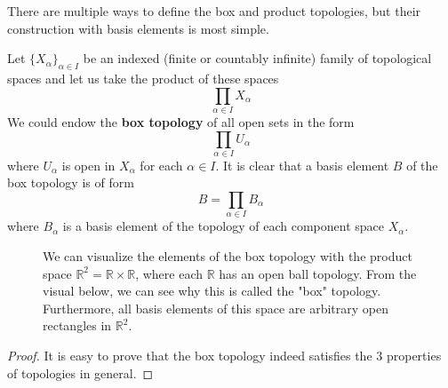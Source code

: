   There are multiple ways to define the box and product topologies, but their construction with basis elements is most simple. 

  \begin{theorem}
    Let $\{X_\alpha\}_{\alpha \in I}$ be an indexed (finite or countably infinite) family of topological spaces and let us take the product of these spaces
    \begin{equation}
      \prod_{\alpha \in I} X_\alpha
    \end{equation}
    We could endow the \textbf{box topology} of all open sets in the form
    \begin{equation}
      \prod_{\alpha \in I} U_\alpha
    \end{equation}
    where $U_\alpha$ is open in $X_\alpha$ for each $\alpha \in I$. It is clear that a basis element $B$ of the box topology is of form
    \begin{equation}
      B = \prod_{\alpha \in I} B_\alpha
    \end{equation}
    where $B_\alpha$ is a basis element of the topology of each component space $X_\alpha$. 
    \begin{figure}[H]
      \centering 
      \caption{We can visualize the elements of the box topology with the product space $\mathbb{R}^2 = \mathbb{R} \times \mathbb{R}$, where each $\mathbb{R}$ has an open ball topology. From the visual below, we can see why this is called the "box" topology. Furthermore, all basis elements of this space are arbitrary open rectangles in $\mathbb{R}^2$. }
      \label{fig:box_topology}
    \end{figure}
  \end{theorem}
  \begin{proof}
    It is easy to prove that the box topology indeed satisfies the 3 properties of topologies in general. 
  \end{proof}

